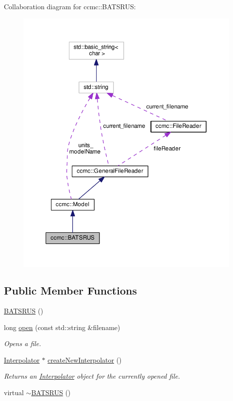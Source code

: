 Collaboration diagram for ccmc\-:\-:B\-A\-T\-S\-R\-U\-S\-:
\nopagebreak
\begin{figure}[H]
\begin{center}
\leavevmode
\includegraphics[width=350pt]{classccmc_1_1_b_a_t_s_r_u_s__coll__graph}
\end{center}
\end{figure}
\subsection*{Public Member Functions}
\begin{DoxyCompactItemize}
\item 
\hyperlink{classccmc_1_1_b_a_t_s_r_u_s_a687bb4cafb036eb5149d5d52be52037d}{B\-A\-T\-S\-R\-U\-S} ()
\item 
long \hyperlink{classccmc_1_1_b_a_t_s_r_u_s_a9acf9929698159533b7a50734665dd1a}{open} (const std\-::string \&filename)
\begin{DoxyCompactList}\small\item\em Opens a file.  \end{DoxyCompactList}\item 
\hyperlink{classccmc_1_1_interpolator}{Interpolator} $\ast$ \hyperlink{classccmc_1_1_b_a_t_s_r_u_s_a3cbd68c8c3fb850c3b10cb314c0a21b3}{create\-New\-Interpolator} ()
\begin{DoxyCompactList}\small\item\em Returns an \hyperlink{classccmc_1_1_interpolator}{Interpolator} object for the currently opened file.  \end{DoxyCompactList}\item 
virtual \hyperlink{classccmc_1_1_b_a_t_s_r_u_s_a087125c4f1ee6883206fd63bf8fb1528}{$\sim$\-B\-A\-T\-S\-R\-U\-S} ()
\end{DoxyCompactItemize}
